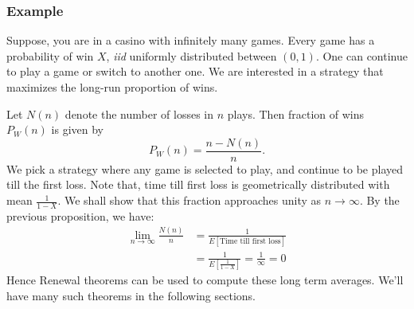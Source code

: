 \documentclass[a4paper,10pt]{article}
\theoremstyle{plain}
\theoremstyle{definition}
\begin{document}
\subsubsection{Example}
Suppose, you are in a casino with infinitely many games. Every game has a probability of win $X$, \emph{iid} uniformly distributed between $(0,1)$. One can continue to play a game or switch to another one. We are interested in a strategy that maximizes the long-run proportion of wins.

Let $N(n)$ denote the number of losses in $n$ plays. Then fraction of wins $P_W(n)$ is given by 
\begin{equation*}
P_W(n) = \frac{n-N(n)}{n}.
\end{equation*}
We pick a strategy where any game is selected to play, and continue to be played till the first loss. Note that, time till first loss is geometrically distributed with mean $\frac{1}{1-X}$. We shall show that this fraction approaches unity as $n \to \infty$. By the previous proposition, we have:
\begin{align*}
\lim_{n \to \infty} \frac{N(n)}{n} &= \frac{1}{E[\mbox{Time till first loss}]} \\
&= \frac{1}{E\left[\frac{1}{1-X}\right]} = \frac{1}{\infty} = 0
\end{align*}
Hence Renewal theorems can be used to compute these long term averages. We'll have many such theorems in the following sections.
\end{document}
